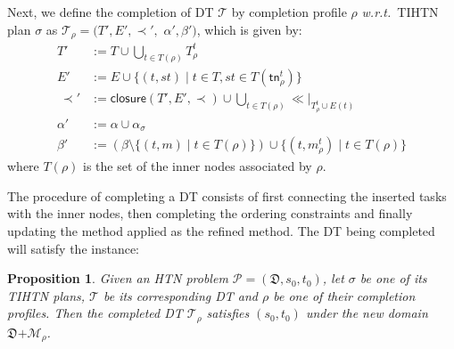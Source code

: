 \documentclass[letterpaper]{article} %
\newtheorem{definition}{Definition}
\newtheorem{proposition}{Proposition}
\newcommand{\HtnDomain}{\mathfrak{D}}
\newcommand{\Methods}{\mathcal{M}}
\newcommand{\HtnProblem}{\mathcal{P}}
\newcommand{\tn}{\mathsf{tn}}
\newcommand{\plan}{\sigma}
\newcommand{\Dtree}{\mathcal{T}}
\newcommand{\ch}{\mathsf{ch}}
\newcommand{\Tasksof}{T}
\newcommand{\aspplus}{\textsf{+}}
\newcommand{\aspprec}{\ll}
\newcommand{\improveFunction}{\rho}
\newcommand{\BEF}{\mathsf{B}}
\newcommand{\AFT}{\mathsf{A}}
\newcommand{\closure}{\mathsf{closure}}
\begin{document}
Next, %
we define the completion of DT $\Dtree$ by completion profile $\improveFunction$ \emph{w.r.t.}\ TIHTN plan $\plan$ as $\Dtree_\improveFunction = (T',E',{\prec',}$ $\alpha',\beta')$, which is given by:
\begin{align*}
  T' &:= T \cup  \textstyle \bigcup_{t \in \Tasksof(\improveFunction)} T_\improveFunction^t \\
  E' &:= E \cup  \{(t,st)\mid t\in T, st\in\Tasksof(\tn_\improveFunction^t)\} \\
  \ \prec'\! &:= \closure(T',E',\prec) \cup \textstyle \bigcup_{t\in\Tasksof(\improveFunction)}\aspprec\!\!|_{T^t_\improveFunction \cup E(t)}\\
  \alpha' &:= \alpha \cup \alpha_{\plan}\\
  \beta' &:= (\beta \setminus \{(t,m)\mid t \in \Tasksof(\improveFunction)\}) \cup \{(t,m_\improveFunction^t)\mid t \in \Tasksof(\improveFunction)\}
\end{align*}
where $\Tasksof(\improveFunction)$ is the set of the inner nodes associated by $\improveFunction$.

The procedure of completing a DT consists of first connecting the inserted tasks with the inner nodes, then completing the ordering constraints and finally updating the method applied as the refined method.
The DT being completed will satisfy the instance: %

\begin{proposition}\label{prop:complete_tree}
Given an HTN problem $\HtnProblem {=} (\HtnDomain,s_0,t_0)$, let $\plan$ be one of its TIHTN plans, $\Dtree$ be its corresponding DT and $\improveFunction$ be one of their completion profiles. Then the completed DT $\Dtree_{\improveFunction}$ satisfies $(s_0,t_0)$ under the new domain $\HtnDomain \aspplus \Methods_{\improveFunction}$.
\end{proposition}
\end{document}
